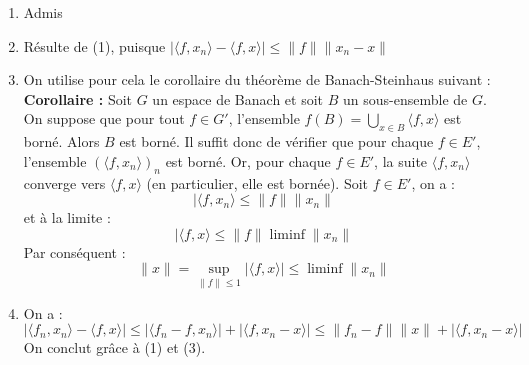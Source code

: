 
\begin{dem}
\begin{enumerate}
\item Admis
\item Résulte de (1), puisque $|\langle f, x_n\rangle - \langle f,x\rangle|\leq \|f\|\|x_n-x\|$
\item On utilise pour cela le corollaire du théorème de Banach-Steinhaus suivant : \\
	\textbf{Corollaire :} Soit $G$ un espace de Banach et soit $B$ un sous-ensemble de $G$. On suppose que pour tout $f\in G'$, l'ensemble $f(B)=\bigcup_{x\in B}\langle f,x\rangle$ est borné. Alors $B$ est borné.
Il suffit donc de vérifier que pour chaque $f\in E'$, l'ensemble $(\langle f, x_n\rangle)_n$ est borné. Or, pour chaque $f\in E'$, la suite $\langle f,x_n\rangle$ converge vers $\langle f,x\rangle$ (en particulier, elle est bornée). Soit $f\in E'$, on a : \[|\langle f,x_n\rangle\leq \|f\|\|x_n\|\]
et à la limite : \[|\langle f,x\rangle\leq \|f\|\liminf \|x_n\|\]
Par conséquent : \[\|x\|=\sup_{\|f\|\leq 1} |\langle f,x\rangle|\leq \liminf \|x_n\|\]
\item On a :
	\[|\langle f_n,x_n\rangle-\langle f,x\rangle|\leq |\langle f_n-f,x_n\rangle|+|\langle f,x_n-x\rangle|\leq\|f_n-f\|\|x\|+|\langle f,x_n-x\rangle|\]
On conclut grâce à (1) et (3).
\end{enumerate}
\end{dem}

